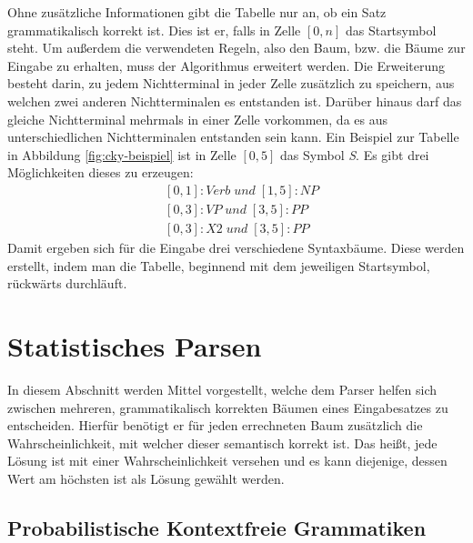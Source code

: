 Ohne zusätzliche Informationen gibt die Tabelle nur an, ob ein Satz grammatikalisch korrekt ist. Dies ist er, falls in Zelle \([0, n]\) das Startsymbol steht. Um außerdem die verwendeten Regeln, also den Baum, bzw. die Bäume zur Eingabe zu erhalten, muss der Algorithmus erweitert werden. Die Erweiterung besteht darin, zu jedem Nichtterminal in jeder Zelle zusätzlich zu speichern, aus welchen zwei anderen Nichtterminalen es entstanden ist. Darüber hinaus darf das gleiche Nichtterminal mehrmals in einer Zelle vorkommen, da es aus unterschiedlichen Nichtterminalen entstanden sein kann. Ein Beispiel zur Tabelle in Abbildung \ref{fig:cky-beispiel} ist in Zelle \([0, 5]\) das Symbol \textit{S}. Es gibt drei Möglichkeiten dieses zu erzeugen: 
\begin{align}
& [0, 1]:Verb \; und\; [1, 5]:NP \nonumber \\ & [0, 3]:VP \; und \; [3, 5]:PP \nonumber \\ & [0, 3]:X2 \; und \; [3, 5]:PP
\end{align}
Damit ergeben sich für die Eingabe drei verschiedene Syntaxbäume. Diese werden erstellt, indem man die Tabelle, beginnend mit dem jeweiligen Startsymbol, rückwärts durchläuft.

\section{Statistisches Parsen}
\label{sec:nlp:stat-parsen}

In diesem Abschnitt werden Mittel vorgestellt, welche dem Parser helfen sich zwischen mehreren, grammatikalisch korrekten Bäumen eines Eingabesatzes zu entscheiden. Hierfür benötigt er für jeden errechneten Baum zusätzlich die Wahrscheinlichkeit, mit welcher dieser semantisch korrekt ist. Das heißt, jede Lösung ist mit einer Wahrscheinlichkeit versehen und es kann diejenige, dessen Wert am höchsten ist als Lösung gewählt werden. %

\subsection{Probabilistische Kontextfreie Grammatiken}
\label{sec:nlp:stat-parsen:pcfg}

